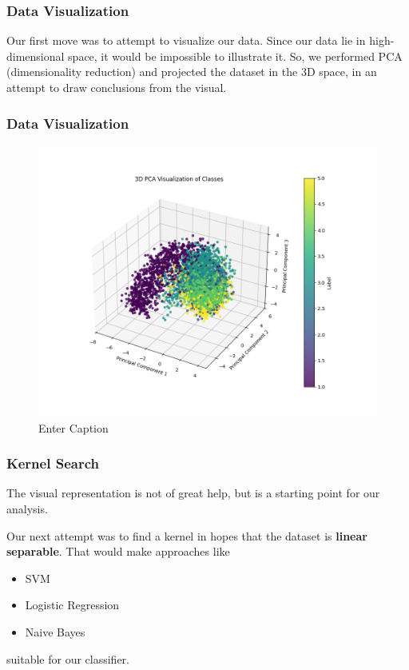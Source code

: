 \documentclass{beamer}
\begin{document}
\begin{frame}
\frametitle{Data Visualization}
Our first move was to attempt to visualize our data. Since our data lie in high-dimensional space, it would be impossible to illustrate it. So, we performed PCA (dimensionality reduction) and projected the dataset in the 3D space, in an attempt to draw conclusions from the visual. 
\end{frame}

\begin{frame}
\frametitle{Data Visualization}
\begin{figure}
    \centering
    \includegraphics[width=1\linewidth]{assets/datasetTV.png}
    \caption{Enter Caption}
    \label{fig:enter-label}
\end{figure}
\end{frame}

\begin{frame}
\frametitle{Kernel Search}
The visual representation is not of great help, but is a starting point for our analysis. 

Our next attempt was to find a kernel in hopes that the dataset is \textbf{linear separable}. That would make approaches like
\begin{itemize}
    \item SVM
    \item Logistic Regression
    \item Naive Bayes
\end{itemize}
suitable for our classifier.
\end{frame}
\end{document}

